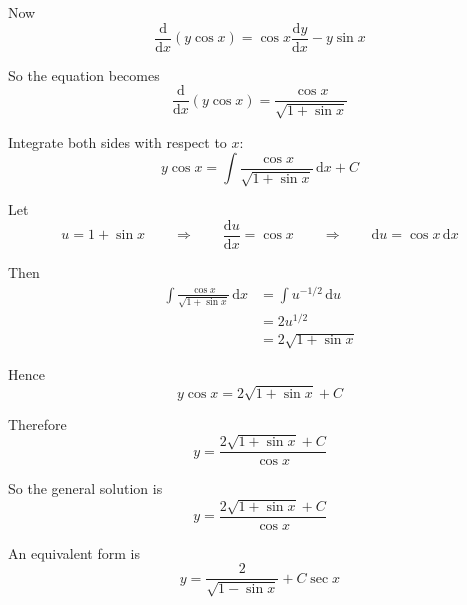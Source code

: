 \documentclass[leqno]{article}
\begin{document}
\begin{enumerate}[
  label=\textbf{\arabic*.},
  leftmargin=*,
  topsep=0pt,
  partopsep=0pt,
  parsep=0pt
]
\begin{tcolorbox}[colback=white, colframe=scarlet, title={\textbf{Solution}}, breakable, grow to left by=6mm, grow to right by=10mm]
Now
\[
\frac{\mathrm{d}}{\mathrm{d}x}(y\cos x)=\cos x\frac{\mathrm{d}y}{\mathrm{d}x}-y\sin x
\]

So the equation becomes
\[
\frac{\mathrm{d}}{\mathrm{d}x}(y\cos x)=\frac{\cos x}{\sqrt{1+\sin x}}
\]

Integrate both sides with respect to $x$:
\[
y\cos x=\int \frac{\cos x}{\sqrt{1+\sin x}}\,\mathrm{d}x + C
\]

Let
\[
u=1+\sin x
\qquad \Rightarrow \qquad
\frac{\mathrm{d}u}{\mathrm{d}x}=\cos x
\qquad \Rightarrow \qquad
\mathrm{d}u=\cos x\,\mathrm{d}x
\]

Then
\begin{align*}
\int \frac{\cos x}{\sqrt{1+\sin x}}\,\mathrm{d}x
&= \int u^{-1/2}\,\mathrm{d}u \\
&= 2u^{1/2} \\
&= 2\sqrt{1+\sin x}
\end{align*}

Hence
\[
y\cos x=2\sqrt{1+\sin x}+C
\]

Therefore
\[
y=\frac{2\sqrt{1+\sin x}+C}{\cos x}
\]

So the general solution is
\[
y=\frac{2\sqrt{1+\sin x}+C}{\cos x}
\]

An equivalent form is
\[
y=\frac{2}{\sqrt{1-\sin x}}+C\sec x
\]
\end{tcolorbox}

\end{enumerate}
\end{document}
